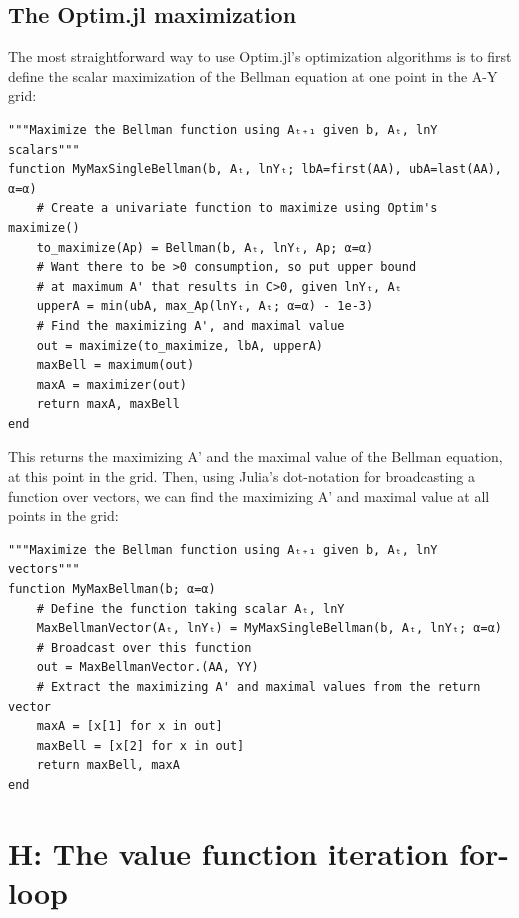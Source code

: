 \documentclass[12pt]{article}
\begin{document}
\newpage
\subsection*{The Optim.jl maximization}
The most straightforward way to use Optim.jl's optimization algorithms is to first define the scalar maximization of the Bellman equation at one point in the A-Y grid:
\begin{lstlisting}[language=JuliaLocal, style=julia]
"""Maximize the Bellman function using Aₜ₊₁ given b, Aₜ, lnY scalars"""
function MyMaxSingleBellman(b, Aₜ, lnYₜ; lbA=first(AA), ubA=last(AA), α=α)
    # Create a univariate function to maximize using Optim's maximize()
    to_maximize(Ap) = Bellman(b, Aₜ, lnYₜ, Ap; α=α)
    # Want there to be >0 consumption, so put upper bound
    # at maximum A' that results in C>0, given lnYₜ, Aₜ
    upperA = min(ubA, max_Ap(lnYₜ, Aₜ; α=α) - 1e-3)
    # Find the maximizing A', and maximal value
    out = maximize(to_maximize, lbA, upperA)
    maxBell = maximum(out)
    maxA = maximizer(out)
    return maxA, maxBell
end
\end{lstlisting}

This returns the maximizing A' and the maximal value of the Bellman equation, at this point in the grid. Then, using Julia's dot-notation for broadcasting a function over vectors, we can find the maximizing A' and maximal value at all points in the grid:
\begin{lstlisting}[language=JuliaLocal, style=julia]
"""Maximize the Bellman function using Aₜ₊₁ given b, Aₜ, lnY vectors"""
function MyMaxBellman(b; α=α)
    # Define the function taking scalar Aₜ, lnY
    MaxBellmanVector(Aₜ, lnYₜ) = MyMaxSingleBellman(b, Aₜ, lnYₜ; α=α)
    # Broadcast over this function
    out = MaxBellmanVector.(AA, YY)
    # Extract the maximizing A' and maximal values from the return vector
    maxA = [x[1] for x in out]
    maxBell = [x[2] for x in out]
    return maxBell, maxA
end
\end{lstlisting}










\newpage
\section*{H: The value function iteration for-loop}
\end{document}
